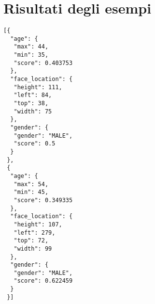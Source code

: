 
\section{Risultati degli esempi}
%
\begin{lstlisting}[style=myJSON,
	caption=Risultato dell'interrogazione a IBM Visual Recognition per volti (figura~\ref{fig:riconscimento-volti}),
	label=lst:risultati-ibm-volti]
[{
  "age": {
   "max": 44,
   "min": 35,
   "score": 0.403753
  },
  "face_location": {
   "height": 111,
   "left": 84,
   "top": 38,
   "width": 75
  },
  "gender": {
   "gender": "MALE",
   "score": 0.5
  }
 },
 {
  "age": {
   "max": 54,
   "min": 45,
   "score": 0.349335
  },
  "face_location": {
   "height": 107,
   "left": 279,
   "top": 72,
   "width": 99
  },
  "gender": {
   "gender": "MALE",
   "score": 0.622459
  }
 }]
\end{lstlisting}
